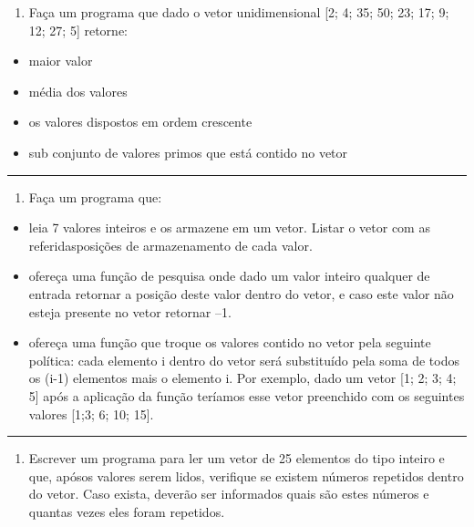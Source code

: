 \documentclass[12pt,a4paper]{article}
\providecommand{\tightlist}{%
      \setlength{\itemsep}{0pt}\setlength{\parskip}{0pt}}
\begin{document}
\begin{enumerate}
\def\labelenumi{\arabic{enumi}.}
\setcounter{enumi}{15}
\tightlist
\item
  Faça um programa que dado o vetor unidimensional {[}2; 4; 35; 50; 23;
  17; 9; 12; 27; 5{]} retorne:\\
\end{enumerate}

\begin{itemize}
\tightlist
\item
  maior valor
\item
  média dos valores
\item
  os valores dispostos em ordem crescente
\item
  sub conjunto de valores primos que está contido no vetor
\end{itemize}

    \begin{center}\rule{0.5\linewidth}{0.5pt}\end{center}

\begin{enumerate}
\def\labelenumi{\arabic{enumi}.}
\setcounter{enumi}{16}
\tightlist
\item
  Faça um programa que:
\end{enumerate}

\begin{itemize}
\tightlist
\item
  leia 7 valores inteiros e os armazene em um vetor. Listar o vetor com
  as referidasposições de armazenamento de cada valor.
\item
  ofereça uma função de pesquisa onde dado um valor inteiro qualquer de
  entrada retornar a posição deste valor dentro do vetor, e caso este
  valor não esteja presente no vetor retornar --1.
\item
  ofereça uma função que troque os valores contido no vetor pela
  seguinte política: cada elemento i dentro do vetor será substituído
  pela soma de todos os (i-1) elementos mais o elemento i. Por exemplo,
  dado um vetor {[}1; 2; 3; 4; 5{]} após a aplicação da função teríamos
  esse vetor preenchido com os seguintes valores {[}1;3; 6; 10; 15{]}.
\end{itemize}

    \begin{center}\rule{0.5\linewidth}{0.5pt}\end{center}

\begin{enumerate}
\def\labelenumi{\arabic{enumi}.}
\setcounter{enumi}{17}
\tightlist
\item
  Escrever um programa para ler um vetor de 25 elementos do tipo inteiro
  e que, apósos valores serem lidos, verifique se existem números
  repetidos dentro do vetor. Caso exista, deverão ser informados quais
  são estes números e quantas vezes eles foram repetidos.
\end{enumerate}
\end{document}
